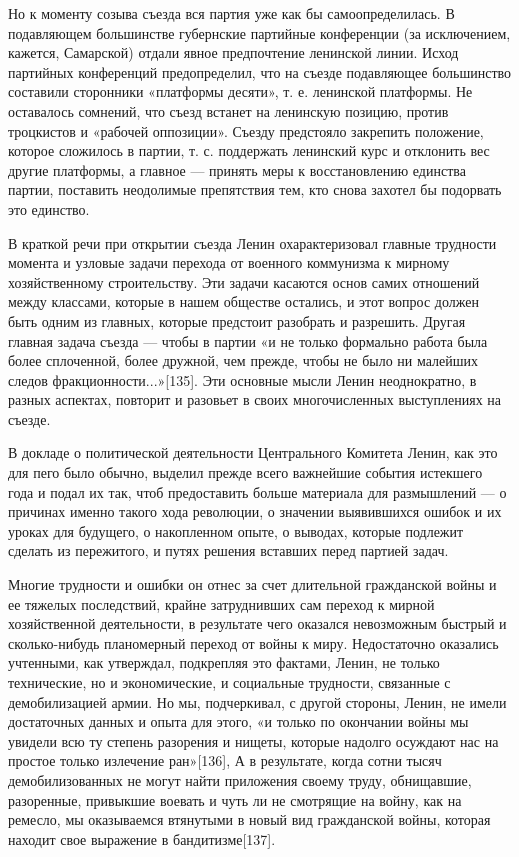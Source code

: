 \documentclass[12pt, a4paper, openany]{book}
\begin{document}
Но к моменту созыва съезда вся партия уже как бы самоопределилась. В подавляющем большинстве губернские партийные конференции (за исключением, кажется, Самарской) отдали явное предпочтение ленинской линии. Исход партийных конференций предопределил, что на съезде подавляющее большинство составили сторонники «платформы десяти», т. е. ленинской платформы. Не оставалось сомнений, что съезд встанет на ленинскую позицию, против троцкистов и «рабочей оппозиции». Съезду предстояло закрепить положение, которое сложилось в партии, т. с. поддержать ленинский курс и отклонить вес другие платформы, а главное — принять меры к восстановлению единства партии, поставить неодолимые препятствия тем, кто снова захотел бы подорвать это единство.

В краткой речи при открытии съезда Ленин охарактеризовал главные трудности момента и узловые задачи перехода от военного коммунизма к мирному хозяйственному строительству. Эти задачи касаются основ самих отношений между классами, которые в нашем обществе остались, и этот вопрос должен быть одним из главных, которые предстоит разобрать и разрешить. Другая главная задача съезда — чтобы в партии «и не только формально работа была более сплоченной, более дружной, чем прежде, чтобы не было ни малейших следов фракционности...»[135]. Эти основные мысли Ленин неоднократно, в разных аспектах, повторит и разовьет в своих многочисленных выступлениях на съезде.

В докладе о политической деятельности Центрального Комитета Ленин, как это для пего было обычно, выделил прежде всего важнейшие события истекшего года и подал их так, чтоб предоставить больше материала для размышлений — о причинах именно такого хода революции, о значении выявившихся ошибок и их уроках для будущего, о накопленном опыте, о выводах, которые подлежит сделать из пережитого, и путях решения вставших перед партией задач.

Многие трудности и ошибки он отнес за счет длительной гражданской войны и ее тяжелых последствий, крайне затруднивших сам переход к мирной хозяйственной деятельности, в результате чего оказался невозможным быстрый и сколько-нибудь планомерный переход от войны к миру. Недостаточно оказались учтенными, как утверждал, подкрепляя это фактами, Ленин, не только технические, но и экономические, и социальные трудности, связанные с демобилизацией армии. Но мы, подчеркивал, с другой стороны, Ленин, не имели достаточных данных и опыта для этого, «и только по окончании войны мы увидели всю ту степень разорения и нищеты, которые надолго осуждают нас на простое только излечение ран»[136], А в результате, когда сотни тысяч демобилизованных не могут найти приложения своему труду, обнищавшие, разоренные, привыкшие воевать и чуть ли не смотрящие на войну, как на ремесло, мы оказываемся втянутыми в новый вид гражданской войны, которая находит свое выражение в бандитизме[137].
\end{document}
